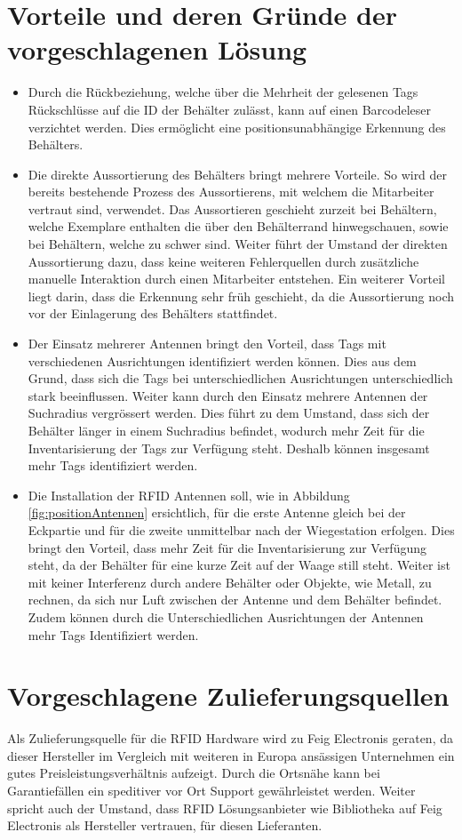 \section{Vorteile und deren Gründe der vorgeschlagenen Lösung}
\begin{itemize}
	\item Durch die Rückbeziehung, welche über die Mehrheit der gelesenen Tags Rückschlüsse auf die ID der Behälter zulässt, kann auf einen Barcodeleser verzichtet werden. Dies ermöglicht eine positionsunabhängige Erkennung des Behälters.
	\item Die direkte Aussortierung des Behälters bringt mehrere Vorteile. So wird der bereits bestehende Prozess des Aussortierens, mit welchem die Mitarbeiter vertraut sind, verwendet. Das Aussortieren geschieht zurzeit bei Behältern, welche Exemplare enthalten die über den Behälterrand hinwegschauen, sowie bei Behältern, welche zu schwer sind. Weiter führt der Umstand der direkten Aussortierung dazu, dass keine weiteren Fehlerquellen durch zusätzliche manuelle Interaktion durch einen Mitarbeiter entstehen. Ein weiterer Vorteil liegt darin, dass die Erkennung sehr früh geschieht, da die Aussortierung noch vor der Einlagerung des Behälters stattfindet.
	\item Der Einsatz mehrerer Antennen bringt den Vorteil, dass Tags mit verschiedenen Ausrichtungen identifiziert werden können. Dies aus dem Grund, dass sich die Tags bei unterschiedlichen Ausrichtungen unterschiedlich stark beeinflussen. Weiter kann durch den Einsatz mehrere Antennen der Suchradius vergrössert werden. Dies führt zu dem Umstand, dass sich der Behälter länger in einem Suchradius befindet, wodurch mehr Zeit für die Inventarisierung der Tags zur Verfügung steht. Deshalb können insgesamt mehr Tags identifiziert  werden.
	\item Die Installation der RFID Antennen soll, wie in Abbildung \ref{fig:positionAntennen} ersichtlich, für die erste Antenne gleich bei der Eckpartie und für die zweite unmittelbar nach der Wiegestation erfolgen. Dies bringt den Vorteil, dass mehr Zeit für die Inventarisierung zur Verfügung steht, da der Behälter für eine kurze Zeit auf der Waage still steht. Weiter ist mit keiner Interferenz durch andere Behälter oder Objekte, wie Metall, zu rechnen, da sich nur Luft zwischen der Antenne und dem Behälter befindet. Zudem können durch die Unterschiedlichen Ausrichtungen der Antennen mehr Tags Identifiziert werden.
\end{itemize}


\section{Vorgeschlagene Zulieferungsquellen}
\label{sec:VorschlagQuellen}
Als Zulieferungsquelle für die RFID Hardware wird zu Feig Electronis geraten, da dieser Hersteller im Vergleich mit weiteren in Europa ansässigen Unternehmen ein gutes Preisleistungsverhältnis aufzeigt. Durch die Ortsnähe kann bei Garantiefällen ein speditiver vor Ort Support gewährleistet werden. Weiter spricht auch der Umstand, dass RFID Lösungsanbieter wie Bibliotheka auf Feig Electronis als Hersteller vertrauen, für diesen Lieferanten.

